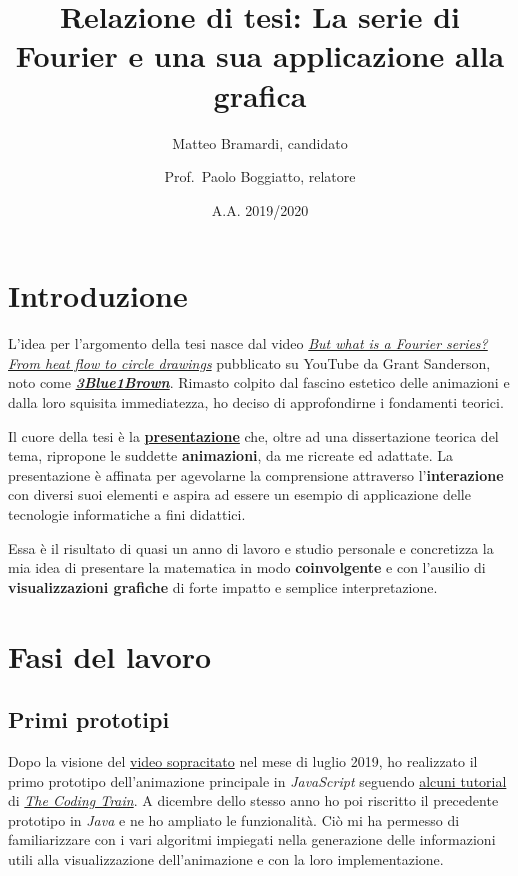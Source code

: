 \documentclass[
]{book}
\title{Relazione di tesi: La serie di Fourier e una sua applicazione alla grafica}
\author{Matteo Bramardi, candidato \and Prof.~Paolo Boggiatto, relatore}
\date{A.A. 2019/2020}
\begin{document}
\maketitle

{
\setcounter{tocdepth}{1}
\tableofcontents
}
\hypertarget{introduzione}{%
\chapter*{Introduzione}\label{introduzione}}

L'idea per l'argomento della tesi nasce dal video \href{https://www.youtube.com/watch?v=r6sGWTCMz2k}{\emph{But what is a Fourier series? From heat flow to circle drawings}} pubblicato su YouTube da Grant Sanderson, noto come \href{https://www.youtube.com/c/3blue1brown}{\emph{\textbf{3Blue1Brown}}}. Rimasto colpito dal fascino estetico delle animazioni e dalla loro squisita immediatezza, ho deciso di approfondirne i fondamenti teorici.

Il cuore della tesi è la \href{https://bradwave.github.io/thesis}{\textbf{presentazione}} che, oltre ad una dissertazione teorica del tema, ripropone le suddette \textbf{animazioni}, da me ricreate ed adattate. La presentazione è affinata per agevolarne la comprensione attraverso l'\textbf{interazione} con diversi suoi elementi e aspira ad essere un esempio di applicazione delle tecnologie informatiche a fini didattici.

Essa è il risultato di quasi un anno di lavoro e studio personale e concretizza la mia idea di presentare la matematica in modo \textbf{coinvolgente} e con l'ausilio di \textbf{visualizzazioni grafiche} di forte impatto e semplice interpretazione.

\hypertarget{lavoro}{%
\chapter{Fasi del lavoro}\label{lavoro}}

\hypertarget{prototipi}{%
\section{Primi prototipi}\label{prototipi}}

Dopo la visione del \href{https://www.youtube.com/watch?v=r6sGWTCMz2k}{video sopracitato} nel mese di luglio 2019, ho realizzato il primo prototipo dell'animazione principale in \emph{JavaScript} seguendo \href{https://www.youtube.com/watch?v=MY4luNgGfms}{alcuni tutorial} di \href{https://www.youtube.com/thecodingtrain}{\emph{The Coding Train}}. A dicembre dello stesso anno ho poi riscritto il precedente prototipo in \emph{Java} e ne ho ampliato le funzionalità. Ciò mi ha permesso di familiarizzare con i vari algoritmi impiegati nella generazione delle informazioni utili alla visualizzazione dell'animazione e con la loro implementazione.
\end{document}
